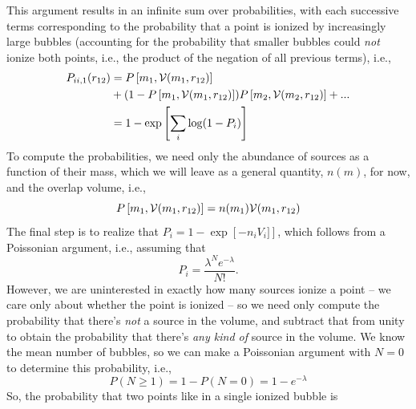 This argument results in an infinite sum over probabilities, with each successive terms corresponding to the probability that a point is ionized by increasingly large bubbles (accounting for the probability that smaller bubbles could \textit{not} ionize both points, i.e., the product of the negation of all previous terms), i.e.,
\begin{align}
    P_{ii,1} (r_{12}) & = P\left[m_1,\mathcal{V}(m_1,r_{12})\right] \nonumber \\
    & + (1 - P\left[m_1,\mathcal{V}(m_1,r_{12})\right]) P\left[m_2,\mathcal{V}(m_2,r_{12})\right] + ... \nonumber \\
    & = 1 - \exp \left[ \sum_i \log(1 - P_i) \right]
\end{align}
To compute the probabilities, we need only the abundance of sources as a function of their mass, which we will leave as a general quantity, $n(m)$, for now, and the overlap volume, i.e.,
\begin{equation}
    P\left[m_1,\mathcal{V}(m_1,r_{12})\right] = n(m_1) \mathcal{V}(m_1,r_{12})
\end{equation}
The final step is to realize that $P_i = 1 - \exp\left[-n_i V_i] \right]$, which follows from a Poissonian argument, i.e., assuming that
\begin{equation}
    P_i = \frac{\lambda^N e^{-\lambda}}{N!} .
\end{equation}
However, we are uninterested in exactly how many sources ionize a point -- we care only about whether the point is ionized -- so we need only compute the probability that there's \textit{not} a source in the volume, and subtract that from unity to obtain the probability that there's \textit{any kind of} source in the volume. We know the mean number of bubbles, so we can make a Poissonian argument with $N=0$ to determine this probability, i.e.,
\begin{equation}
    P(N \geq 1) = 1 - P(N = 0) = 1 - e^{-\lambda} \label{eq:P1src}
\end{equation}
So, the probability that two points like in a single ionized bubble is

